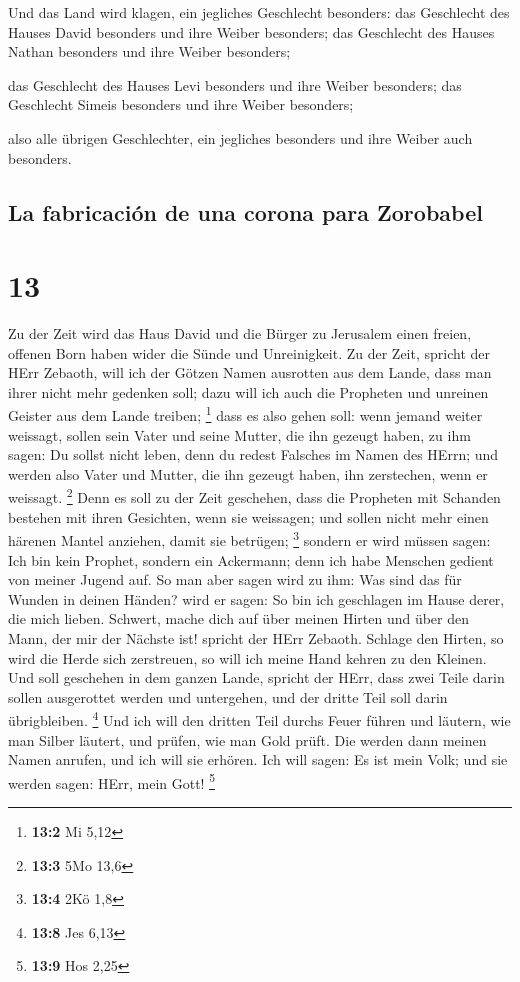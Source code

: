  Und das Land wird klagen, ein jegliches Geschlecht
besonders: das Geschlecht des Hauses David besonders und ihre Weiber
besonders; das Geschlecht des Hauses Nathan besonders und ihre Weiber
besonders;

 das Geschlecht des Hauses Levi besonders und ihre Weiber
besonders; das Geschlecht Simeis besonders und ihre Weiber besonders;

 also alle übrigen Geschlechter, ein jegliches besonders
und ihre Weiber auch besonders.

\hypertarget{la-fabricaciuxf3n-de-una-corona-para-zorobabel}{%
\subsection{La fabricación de una corona para
Zorobabel}\label{la-fabricaciuxf3n-de-una-corona-para-zorobabel}}

\hypertarget{section-12}{%
\section{13}\label{section-12}}

 Zu der Zeit wird das Haus David und die Bürger zu
Jerusalem einen freien, offenen Born haben wider die Sünde und
Unreinigkeit.  Zu der Zeit, spricht der HErr Zebaoth, will
ich der Götzen Namen ausrotten aus dem Lande, dass man ihrer nicht mehr
gedenken soll; dazu will ich auch die Propheten und unreinen Geister aus
dem Lande treiben; \footnote{\textbf{13:2} Mi 5,12}  dass
es also gehen soll: wenn jemand weiter weissagt, sollen sein Vater und
seine Mutter, die ihn gezeugt haben, zu ihm sagen: Du sollst nicht
leben, denn du redest Falsches im Namen des HErrn; und werden also Vater
und Mutter, die ihn gezeugt haben, ihn zerstechen, wenn er weissagt.
\footnote{\textbf{13:3} 5Mo 13,6}  Denn es soll zu der
Zeit geschehen, dass die Propheten mit Schanden bestehen mit ihren
Gesichten, wenn sie weissagen; und sollen nicht mehr einen härenen
Mantel anziehen, damit sie betrügen; \footnote{\textbf{13:4} 2Kö 1,8}
 sondern er wird müssen sagen: Ich bin kein Prophet,
sondern ein Ackermann; denn ich habe Menschen gedient von meiner Jugend
auf.  So man aber sagen wird zu ihm: Was sind das für
Wunden in deinen Händen? wird er sagen: So bin ich geschlagen im Hause
derer, die mich lieben.  Schwert, mache dich auf über
meinen Hirten und über den Mann, der mir der Nächste ist! spricht der
HErr Zebaoth. Schlage den Hirten, so wird die Herde sich zerstreuen, so
will ich meine Hand kehren zu den Kleinen.  Und soll
geschehen in dem ganzen Lande, spricht der HErr, dass zwei Teile darin
sollen ausgerottet werden und untergehen, und der dritte Teil soll darin
übrigbleiben. \footnote{\textbf{13:8} Jes 6,13}  Und ich
will den dritten Teil durchs Feuer führen und läutern, wie man Silber
läutert, und prüfen, wie man Gold prüft. Die werden dann meinen Namen
anrufen, und ich will sie erhören. Ich will sagen: Es ist mein Volk; und
sie werden sagen: HErr, mein Gott! \footnote{\textbf{13:9} Hos 2,25}

